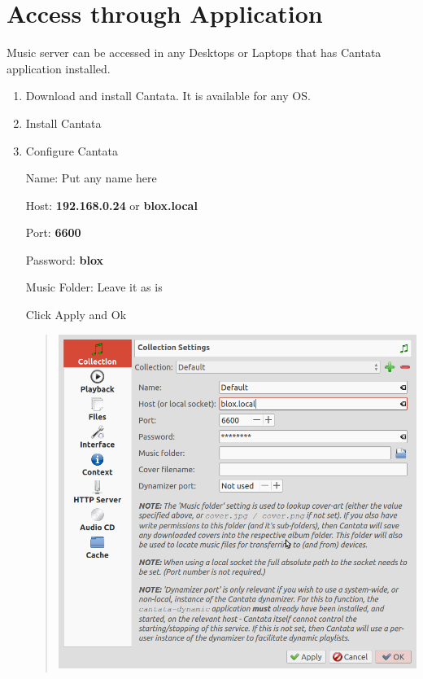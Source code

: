 \documentclass[letterpaper,10pt,english]{sphinxmanual}
\begin{document}
\section{Access through Application}
\label{music:access-through-application}
Music server can be accessed in any Desktops or Laptops that has Cantata application installed.
\begin{enumerate}
\item {} 
Download and install Cantata. It is available for any OS.

\item {} 
Install Cantata

\item {} 
Configure Cantata

Name: Put any name here

Host: \textbf{192.168.0.24} or \textbf{blox.local}

Port: \textbf{6600}

Password: \textbf{blox}

Music Folder: Leave it as is

Click Apply and Ok
\begin{quote}

\includegraphics{cantata-config.png}
\end{quote}

\end{enumerate}
\end{document}
